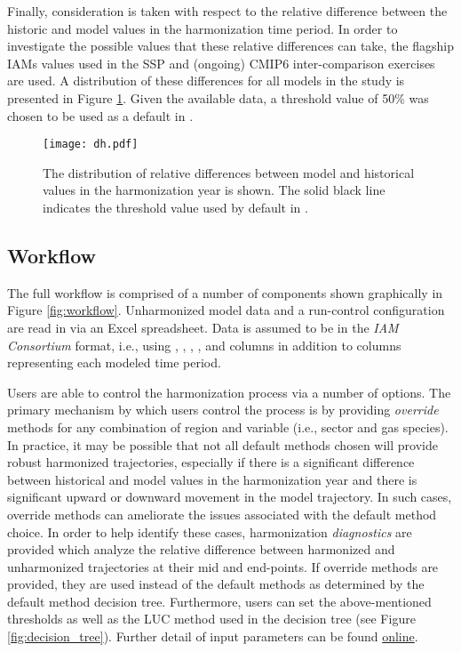 Finally, consideration is taken with respect to the relative difference between
the historic and model values in the harmonization time period. In order to
investigate the possible values that these relative differences can take, the
flagship IAMs values used in the SSP and (ongoing) CMIP6 inter-comparison
exercises are used. A distribution of these differences for all models in the
study is presented in Figure \ref{fig:dh}. Given the available data, a threshold
value of 50\% was chosen to be used as a default in .

\begin{figure}
  \begin{center}
    \texttt{[image: dh.pdf]}
    \caption[]{
      \label{fig:dh}
      The distribution of relative differences between model and historical
      values in the harmonization year is shown. The solid black line indicates
      the threshold value used by default in .  
    }
  \end{center}
\end{figure}

\subsection{ Workflow}\label{sec:workflow}

The full  workflow is comprised of a number of components shown
graphically in Figure \ref{fig:workflow}. Unharmonized model data and a
run-control configuration are read in via an Excel spreadsheet. Data is assumed
to be in the \textit{IAM Consortium} format, i.e., using ,
, , , and  columns in
addition to columns representing each modeled time period. 

Users are able to control the harmonization process via a number of options. The
primary mechanism by which users control the process is by providing
\textit{override} methods for any combination of region and variable (i.e.,
sector and gas species).  In practice, it may be possible that not all default
methods chosen will provide robust harmonized trajectories, especially if there
is a significant difference between historical and model values in the
harmonization year and there is significant upward or downward movement in the
model trajectory. In such cases, override methods can ameliorate the issues
associated with the default method choice. In order to help identify these
cases, harmonization \textit{diagnostics} are provided which analyze the relative
difference between harmonized and unharmonized trajectories at their mid and
end-points. If override methods are provided, they are used instead of the
default methods as determined by the default method decision tree. Furthermore,
users can set the above-mentioned thresholds as well as the LUC method used in
the decision tree (see Figure \ref{fig:decision_tree}). Further detail of input
parameters can be found \href{http://mattgidden.com/aneris/config.html}{online}.

